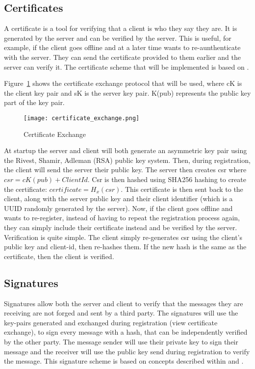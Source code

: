 \subsection{Certificates}
A certificate is a tool for verifying that a client is who they say they are. It is generated by the server and can be verified by the server. This is useful, for example, if the client goes offline and at a later time wants to re-aunthenticate with the server. They can send the certificate provided to them earlier and the server can verify it. The certificate scheme that will be implemented is based on \cite{disSysConceptsDesign}.

Figure~\ref{fig:certificate_exchange} shows the certificate exchange protocol that will be used, where cK is the client key pair and sK is the server key pair. K(pub) represents the public key part of the key pair.
\begin{figure}[h]
\caption{Certificate Exchange}
\texttt{[image: certificate\_exchange.png]}
\label{fig:certificate_exchange}
\end{figure}

At startup the server and client will both generate an asymmetric key pair using the Rivest, Shamir, Adleman (RSA) public key system. Then, during registration, the client will send the server their public key. The server then creates csr where \(csr = cK(pub) + ClientId\). Csr is then hashed using SHA256 hashing to create the certificate: \(certificate = H_x(csr)\). This certificate is then sent back to the client, along with the server public key and their client identifier (which is a UUID randomly generated by the server). Now, if the client goes offline and wants to re-register, instead of having to repeat the registration process again, they can simply include their certificate instead and be verified by the server. Verification is quite simple. The client simply re-generates csr using the client's public key and client-id, then re-hashes them. If the new hash is the same as the certificate, then the client is verified.

\subsection{Signatures}
Signatures allow both the server and client to verify that the messages they are receiving are not forged and sent by a third party. The signatures will use the key-pairs generated and exchanged during registration (view certificate exchange), to sign every message with a hash, that can be independently verified by the other party. The message sender will use their private key to sign their message and the receiver will use the public key send during registration to verify the message. This signature scheme is based on concepts described within \cite{disSysConceptsDesign} and \cite{disSysPrinciples}.

